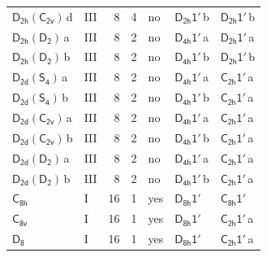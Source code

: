 \documentclass[10pt,a4paper]{article}
\numberwithin{equation}{section}
\newcommand{\grp}[1]{\mathsf{#1}}
\newcommand{\clsletter}[1]{\,{\scriptsize\color{black!55}#1}}
\begin{document}
{\begin{longtable}{@{}llrrlll@{}}
\href{D2h-C2v.pdf}{$\grp{D_{2h}}(\grp{C_{2v}})$}\clsletter{d} & III & 8 & 4 & no & \href{D2h-1p.pdf}{$\grp{D_{2h}1'}$}\clsletter{b} & \href{D2h-1p.pdf}{$\grp{D_{2h}1'}$}\clsletter{b}\\
\href{D2h-D2.pdf}{$\grp{D_{2h}}(\grp{D_{2}})$}\clsletter{a} & III & 8 & 2 & no & \href{D4h-1p.pdf}{$\grp{D_{4h}1'}$}\clsletter{a} & \href{D2h-1p.pdf}{$\grp{D_{2h}1'}$}\clsletter{a}\\
\href{D2h-D2.pdf}{$\grp{D_{2h}}(\grp{D_{2}})$}\clsletter{b} & III & 8 & 2 & no & \href{D4h-1p.pdf}{$\grp{D_{4h}1'}$}\clsletter{b} & \href{D2h-1p.pdf}{$\grp{D_{2h}1'}$}\clsletter{b}\\
\href{D2d-S4.pdf}{$\grp{D_{2d}}(\grp{S_{4}})$}\clsletter{a} & III & 8 & 2 & no & \href{D4h-1p.pdf}{$\grp{D_{4h}1'}$}\clsletter{a} & \href{C2h-1p.pdf}{$\grp{C_{2h}1'}$}\clsletter{a}\\
\href{D2d-S4.pdf}{$\grp{D_{2d}}(\grp{S_{4}})$}\clsletter{b} & III & 8 & 2 & no & \href{D4h-1p.pdf}{$\grp{D_{4h}1'}$}\clsletter{b} & \href{C2h-1p.pdf}{$\grp{C_{2h}1'}$}\clsletter{a}\\
\href{D2d-C2v.pdf}{$\grp{D_{2d}}(\grp{C_{2v}})$}\clsletter{a} & III & 8 & 2 & no & \href{D4h-1p.pdf}{$\grp{D_{4h}1'}$}\clsletter{a} & \href{C2h-1p.pdf}{$\grp{C_{2h}1'}$}\clsletter{a}\\
\href{D2d-C2v.pdf}{$\grp{D_{2d}}(\grp{C_{2v}})$}\clsletter{b} & III & 8 & 2 & no & \href{D4h-1p.pdf}{$\grp{D_{4h}1'}$}\clsletter{b} & \href{C2h-1p.pdf}{$\grp{C_{2h}1'}$}\clsletter{a}\\
\href{D2d-D2.pdf}{$\grp{D_{2d}}(\grp{D_{2}})$}\clsletter{a} & III & 8 & 2 & no & \href{D4h-1p.pdf}{$\grp{D_{4h}1'}$}\clsletter{a} & \href{C2h-1p.pdf}{$\grp{C_{2h}1'}$}\clsletter{a}\\
\href{D2d-D2.pdf}{$\grp{D_{2d}}(\grp{D_{2}})$}\clsletter{b} & III & 8 & 2 & no & \href{D4h-1p.pdf}{$\grp{D_{4h}1'}$}\clsletter{b} & \href{C2h-1p.pdf}{$\grp{C_{2h}1'}$}\clsletter{a}\\
\href{../../../rotation/data/pdf/C8h.pdf}{$\grp{C_{8h}}$} & I & 16 & 1 & yes & \href{D8h-1p.pdf}{$\grp{D_{8h}1'}$} & \href{C8h-1p.pdf}{$\grp{C_{8h}1'}$}\\
\href{../../../rotation/data/pdf/C8v.pdf}{$\grp{C_{8v}}$} & I & 16 & 1 & yes & \href{D8h-1p.pdf}{$\grp{D_{8h}1'}$} & \href{C2h-1p.pdf}{$\grp{C_{2h}1'}$}\clsletter{a}\\
\href{../../../rotation/data/pdf/D8.pdf}{$\grp{D_{8}}$} & I & 16 & 1 & yes & \href{D8h-1p.pdf}{$\grp{D_{8h}1'}$} & \href{C2h-1p.pdf}{$\grp{C_{2h}1'}$}\clsletter{a}\\

\end{longtable}}
\end{document}
